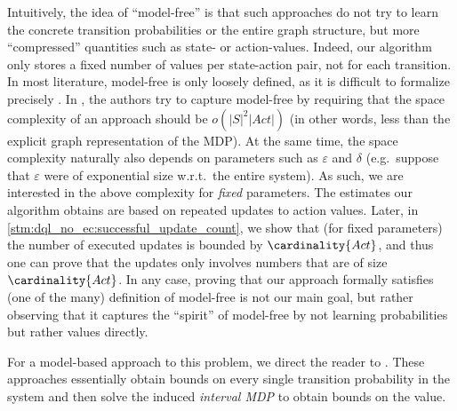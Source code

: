 \documentclass{theoretics}
\newcommand{\States}{S}
\newcommand{\Actions}{Act}
\begin{document}
\begin{remark} \label{rem:model_free}
	Intuitively, the idea of \enquote{model-free} is that such approaches do not try to learn the concrete transition probabilities or the entire graph structure, but more \enquote{compressed} quantities such as state- or action-values.
	Indeed, our algorithm only stores a fixed number of values per state-action pair, not for each transition.
	In most literature, model-free is only loosely defined, as it is difficult to formalize precisely \cite{DBLP:conf/icml/StrehlLWLL06}.
	In \cite[Definition~1]{DBLP:conf/icml/StrehlLWLL06}, the authors try to capture model-free by requiring that the space complexity of an approach should be $o(|\States|^2 |\Actions|)$ (in other words, less than the explicit graph representation of the MDP).
	At the same time, the space complexity naturally also depends on parameters such as $\varepsilon$ and $\delta$ (e.g.\ suppose that $\varepsilon$ were of exponential size w.r.t.\ the entire system).
	As such, we are interested in the above complexity for \emph{fixed} parameters.
	The estimates our algorithm obtains are based on repeated updates to action values.
	Later, in \cref{stm:dql_no_ec:successful_update_count}, we show that (for fixed parameters) the number of executed updates is bounded by $\cardinality{\Actions}$, and thus one can prove that the updates only involves numbers that are of size $\cardinality{\Actions}$.
	In any case, proving that our approach formally satisfies (one of the many) definition of model-free is not our main goal, but rather observing that it captures the \enquote{spirit} of model-free by not learning probabilities but rather values directly.

	For a model-based approach to this problem, we direct the reader to \cite{DBLP:conf/cav/AshokKW19,DBLP:journals/corr/abs-2404-05424}.
	These approaches essentially obtain bounds on every single transition probability in the system and then solve the induced \emph{interval MDP} to obtain bounds on the value.
\end{remark}
\end{document}
